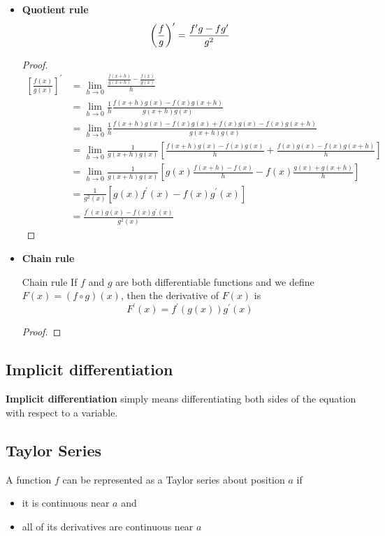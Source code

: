 \begin{itemize}
\item \textbf{Quotient rule}
\[ \left(\frac{f}{g}\right)^\prime = \frac{f^\prime g - fg^\prime}{g^2} \] 

\begin{proof}
\begin{align*}
\left[\frac{f(x)}{g(x)}\right]^\prime &= \lim_{h \to 0} \frac{\frac{f(x+h)}{g(x+h)} - \frac{f(x)}{g(x)}}{h}\\
&= \lim_{h \to 0} \frac{1}{h} \frac{f(x+h) g(x) - f(x) g(x+h)}{g(x+h) g(x)}\\
&= \lim_{h \to 0} \frac{1}{h} \frac{f(x+h) g(x) - f(x) g(x) + f(x) g(x) - f(x) g(x+h)}{g(x+h) g(x)}\\
&= \lim_{h \to 0} \frac{1}{g(x+h) g(x)} \left[ \frac{f(x+h)g(x) - f(x)g(x)}{h} + \frac{f(x)g(x) - f(x)g(x+h)}{h} \right] \\
&= \lim_{h \to 0} \frac{1}{g(x+h) g(x)} \left[ g(x)\frac{f(x+h) - f(x)}{h} - f(x)\frac{g(x) + g(x+h)}{h} \right] \\
&= \frac{1}{g^2(x)} [g(x) f^\prime(x) - f(x) g^\prime(x)] \\
&= \frac{f^\prime(x) g(x) - f(x) g^\prime(x)}{g^2(x)}
\end{align*}
\end{proof}

\item \textbf{Chain rule}
\begin{thrm}{Chain rule}{} 
If $f$ and $g$ are both differentiable functions and we define $F(x) = (f \circ g)(x)$, then the derivative of $F(x)$ is
\begin{equation}
F^\prime (x) = f^\prime(g(x)) g^\prime(x) 
\end{equation} 
\end{thrm}
\begin{proof}

\end{proof}
\end{itemize}

\subsection{Implicit differentiation}
\textbf{Implicit differentiation} simply means differentiating both sides of the equation with respect to a variable.

\subsection{Taylor Series}
A function $f$ can be represented as a Taylor series about position $a$ if
\begin{itemize}
\item it is continuous near $a$ and
\item all of its derivatives are continuous near $a$
\end{itemize}

